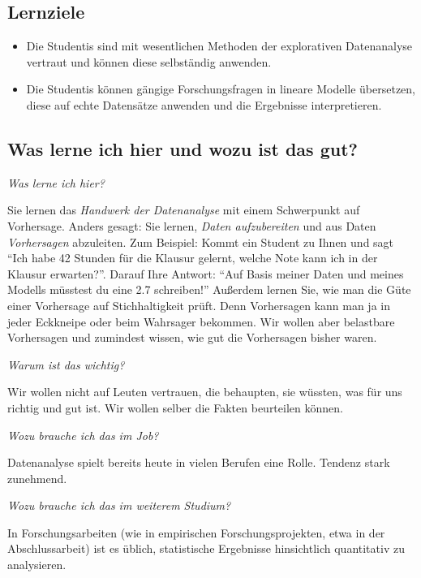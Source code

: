 \documentclass[
  letterpaper,
]{scrbook}
\theoremstyle{definition}
\theoremstyle{definition}
\theoremstyle{definition}
\theoremstyle{remark}
\begin{document}
\subsection{Lernziele}\label{lernziele}

\begin{itemize}
\item
  Die Studentis sind mit wesentlichen Methoden der explorativen
  Datenanalyse vertraut und können diese selbständig anwenden.
\item
  Die Studentis können gängige Forschungsfragen in lineare Modelle
  übersetzen, diese auf echte Datensätze anwenden und die Ergebnisse
  interpretieren.
\end{itemize}

\subsection{Was lerne ich hier und wozu ist das
gut?}\label{was-lerne-ich-hier-und-wozu-ist-das-gut}

\emph{Was lerne ich hier?}

Sie lernen das \emph{Handwerk der Datenanalyse} mit einem Schwerpunkt
auf Vorhersage. Anders gesagt: Sie lernen, \emph{Daten aufzubereiten}
und aus Daten \emph{Vorhersagen} abzuleiten. Zum Beispiel: Kommt ein
Student zu Ihnen und sagt \enquote{Ich habe 42 Stunden für die Klausur
gelernt, welche Note kann ich in der Klausur erwarten?}. Darauf Ihre
Antwort: \enquote{Auf Basis meiner Daten und meines Modells müsstest du
eine 2.7 schreiben!} Außerdem lernen Sie, wie man die Güte einer
Vorhersage auf Stichhaltigkeit prüft. Denn Vorhersagen kann man ja in
jeder Eckkneipe oder beim Wahrsager bekommen. Wir wollen aber belastbare
Vorhersagen und zumindest wissen, wie gut die Vorhersagen bisher waren.

\emph{Warum ist das wichtig?}

Wir wollen nicht auf Leuten vertrauen, die behaupten, sie wüssten, was
für uns richtig und gut ist. Wir wollen selber die Fakten beurteilen
können.

\emph{Wozu brauche ich das im Job?}

Datenanalyse spielt bereits heute in vielen Berufen eine Rolle. Tendenz
stark zunehmend.

\emph{Wozu brauche ich das im weiterem Studium?}

In Forschungsarbeiten (wie in empirischen Forschungsprojekten, etwa in
der Abschlussarbeit) ist es üblich, statistische Ergebnisse hinsichtlich
quantitativ zu analysieren.
\end{document}
